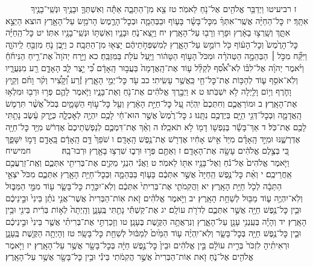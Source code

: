 \documentclass[twoside, openany, parskip=half, 11pt]{book}
\begin{document}
　　　ז רביעיטו וַיְדַבֵּ֥ר אֱלֹהִ֖ים אֶל־נֹ֥חַ לֵאמֹֽר׃ טז צֵ֖א מִן־הַתֵּבָ֑ה אַתָּ֕ה וְאִשְׁתְּךָ֛ וּבָנֶ֥יךָ וּנְשֵֽׁי־בָנֶ֖יךָ אִתָּֽךְ׃ יז כׇּל־הַחַיָּ֨ה אֲשֶֽׁר־אִתְּךָ֜ מִכׇּל־בָּשָׂ֗ר בָּע֧וֹף וּבַבְּהֵמָ֛ה וּבְכׇל־הָרֶ֛מֶשׂ הָרֹמֵ֥שׂ עַל־הָאָ֖רֶץ הוצא הַיְצֵ֣א אִתָּ֑ךְ וְשָֽׁרְצ֣וּ בָאָ֔רֶץ וּפָר֥וּ וְרָב֖וּ עַל־הָאָֽרֶץ׃ יח וַיֵּ֖צֵא־נֹ֑חַ וּבָנָ֛יו וְאִשְׁתּ֥וֹ וּנְשֵֽׁי־בָנָ֖יו אִתּֽוֹ׃ יט כׇּל־הַֽחַיָּ֗ה כׇּל־הָרֶ֙מֶשׂ֙ וְכׇל־הָע֔וֹף כֹּ֖ל רוֹמֵ֣שׂ עַל־הָאָ֑רֶץ לְמִשְׁפְּחֹ֣תֵיהֶ֔ם יָצְא֖וּ מִן־הַתֵּבָֽה׃ כ וַיִּ֥בֶן נֹ֛חַ מִזְבֵּ֖חַ לַֽיהֹוָ֑ה וַיִּקַּ֞ח מִכֹּ֣ל ׀ הַבְּהֵמָ֣ה הַטְּהֹרָ֗ה וּמִכֹּל֙ הָע֣וֹף הַטָּה֔וֹר וַיַּ֥עַל עֹלֹ֖ת בַּמִּזְבֵּֽחַ׃ כא וַיָּ֣רַח יְהֹוָה֮ אֶת־רֵ֣יחַ הַנִּיחֹ֒חַ֒ וַיֹּ֨אמֶר יְהֹוָ֜ה אֶל־לִבּ֗וֹ לֹֽא־אֹ֠סִ֠ף לְקַלֵּ֨ל ע֤וֹד אֶת־הָֽאֲדָמָה֙ בַּעֲב֣וּר הָֽאָדָ֔ם כִּ֠י יֵ֣צֶר לֵ֧ב הָאָדָ֛ם רַ֖ע מִנְּעֻרָ֑יו וְלֹֽא־אֹסִ֥ף ע֛וֹד לְהַכּ֥וֹת אֶת־כׇּל־חַ֖י כַּֽאֲשֶׁ֥ר עָשִֽׂיתִי׃ כב עֹ֖ד כׇּל־יְמֵ֣י הָאָ֑רֶץ זֶ֡רַע וְ֠קָצִ֠יר וְקֹ֨ר וָחֹ֜ם וְקַ֧יִץ וָחֹ֛רֶף וְי֥וֹם וָלַ֖יְלָה לֹ֥א יִשְׁבֹּֽתוּ׃ ט א וַיְבָ֣רֶךְ אֱלֹהִ֔ים אֶת־נֹ֖חַ וְאֶת־בָּנָ֑יו וַיֹּ֧אמֶר לָהֶ֛ם פְּר֥וּ וּרְב֖וּ וּמִלְא֥וּ אֶת־הָאָֽרֶץ׃ ב וּמוֹרַאֲכֶ֤ם וְחִתְּכֶם֙ יִֽהְיֶ֔ה עַ֚ל כׇּל־חַיַּ֣ת הָאָ֔רֶץ וְעַ֖ל כׇּל־ע֣וֹף הַשָּׁמָ֑יִם בְּכֹל֩ אֲשֶׁ֨ר תִּרְמֹ֧שׂ הָֽאֲדָמָ֛ה וּֽבְכׇל־דְּגֵ֥י הַיָּ֖ם בְּיֶדְכֶ֥ם נִתָּֽנוּ׃ ג כׇּל־רֶ֙מֶשׂ֙ אֲשֶׁ֣ר הוּא־חַ֔י לָכֶ֥ם יִהְיֶ֖ה לְאׇכְלָ֑ה כְּיֶ֣רֶק עֵ֔שֶׂב נָתַ֥תִּי לָכֶ֖ם אֶת־כֹּֽל׃ ד אַךְ־בָּשָׂ֕ר בְּנַפְשׁ֥וֹ דָמ֖וֹ לֹ֥א תֹאכֵֽלוּ׃ ה וְאַ֨ךְ אֶת־דִּמְכֶ֤ם לְנַפְשֹֽׁתֵיכֶם֙ אֶדְרֹ֔שׁ מִיַּ֥ד כׇּל־חַיָּ֖ה אֶדְרְשֶׁ֑נּוּ וּמִיַּ֣ד הָֽאָדָ֗ם מִיַּד֙ אִ֣ישׁ אָחִ֔יו אֶדְרֹ֖שׁ אֶת־נֶ֥פֶשׁ הָֽאָדָֽם׃ ו שֹׁפֵךְ֙ דַּ֣ם הָֽאָדָ֔ם בָּֽאָדָ֖ם דָּמ֣וֹ יִשָּׁפֵ֑ךְ כִּ֚י בְּצֶ֣לֶם אֱלֹהִ֔ים עָשָׂ֖ה אֶת־הָאָדָֽם׃ ז וְאַתֶּ֖ם פְּר֣וּ וּרְב֑וּ שִׁרְצ֥וּ בָאָ֖רֶץ וּרְבוּ־בָֽהּ׃
　　　 חמישיח וַיֹּ֤אמֶר אֱלֹהִים֙ אֶל־נֹ֔חַ וְאֶל־בָּנָ֥יו אִתּ֖וֹ לֵאמֹֽר׃ ט וַאֲנִ֕י הִנְנִ֥י מֵקִ֛ים אֶת־בְּרִיתִ֖י אִתְּכֶ֑ם וְאֶֽת־זַרְעֲכֶ֖ם אַֽחֲרֵיכֶֽם׃ י וְאֵ֨ת כׇּל־נֶ֤פֶשׁ הַֽחַיָּה֙ אֲשֶׁ֣ר אִתְּכֶ֔ם בָּע֧וֹף בַּבְּהֵמָ֛ה וּֽבְכׇל־חַיַּ֥ת הָאָ֖רֶץ אִתְּכֶ֑ם מִכֹּל֙ יֹצְאֵ֣י הַתֵּבָ֔ה לְכֹ֖ל חַיַּ֥ת הָאָֽרֶץ׃ יא וַהֲקִמֹתִ֤י אֶת־בְּרִיתִי֙ אִתְּכֶ֔ם וְלֹֽא־יִכָּרֵ֧ת כׇּל־בָּשָׂ֛ר ע֖וֹד מִמֵּ֣י הַמַּבּ֑וּל וְלֹֽא־יִהְיֶ֥ה ע֛וֹד מַבּ֖וּל לְשַׁחֵ֥ת הָאָֽרֶץ׃ יב וַיֹּ֣אמֶר אֱלֹהִ֗ים זֹ֤את אֽוֹת־הַבְּרִית֙ אֲשֶׁר־אֲנִ֣י נֹתֵ֗ן בֵּינִי֙ וּבֵ֣ינֵיכֶ֔ם וּבֵ֛ין כׇּל־נֶ֥פֶשׁ חַיָּ֖ה אֲשֶׁ֣ר אִתְּכֶ֑ם לְדֹרֹ֖ת עוֹלָֽם׃ יג אֶת־קַשְׁתִּ֕י נָתַ֖תִּי בֶּֽעָנָ֑ן וְהָֽיְתָה֙ לְא֣וֹת בְּרִ֔ית בֵּינִ֖י וּבֵ֥ין הָאָֽרֶץ׃ יד וְהָיָ֕ה בְּעַֽנְנִ֥י עָנָ֖ן עַל־הָאָ֑רֶץ וְנִרְאֲתָ֥ה הַקֶּ֖שֶׁת בֶּעָנָֽן׃ טו וְזָכַרְתִּ֣י אֶת־בְּרִיתִ֗י אֲשֶׁ֤ר בֵּינִי֙ וּבֵ֣ינֵיכֶ֔ם וּבֵ֛ין כׇּל־נֶ֥פֶשׁ חַיָּ֖ה בְּכׇל־בָּשָׂ֑ר וְלֹֽא־יִֽהְיֶ֨ה ע֤וֹד הַמַּ֙יִם֙ לְמַבּ֔וּל לְשַׁחֵ֖ת כׇּל־בָּשָֽׂר׃ טז וְהָיְתָ֥ה הַקֶּ֖שֶׁת בֶּֽעָנָ֑ן וּרְאִיתִ֗יהָ לִזְכֹּר֙ בְּרִ֣ית עוֹלָ֔ם בֵּ֣ין אֱלֹהִ֔ים וּבֵין֙ כׇּל־נֶ֣פֶשׁ חַיָּ֔ה בְּכׇל־בָּשָׂ֖ר אֲשֶׁ֥ר עַל־הָאָֽרֶץ׃ יז וַיֹּ֥אמֶר אֱלֹהִ֖ים אֶל־נֹ֑חַ זֹ֤את אֽוֹת־הַבְּרִית֙ אֲשֶׁ֣ר הֲקִמֹ֔תִי בֵּינִ֕י וּבֵ֥ין כׇּל־בָּשָׂ֖ר אֲשֶׁ֥ר עַל־הָאָֽרֶץ׃
\end{document}
